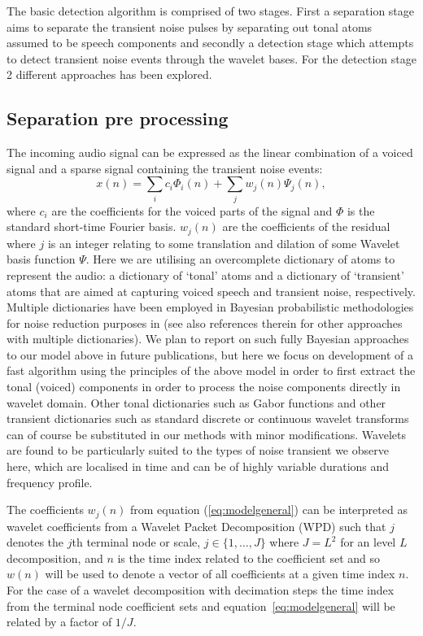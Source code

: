 The basic detection algorithm is comprised of two stages. First a separation stage aims to separate the transient noise pulses by separating out tonal atoms assumed to be speech components and secondly a detection stage which attempts to detect transient noise events through the wavelet bases. For the detection stage 2 different approaches has been explored.

\subsection{Separation pre processing}
The incoming audio signal can be expressed as the linear combination of a voiced signal and a sparse signal containing the transient noise events:
\begin{equation}\label{eq:modelgeneral}
    x(n) = \sum_i c_i \Phi_i(n) + \sum_{j} w_{j}(n) \Psi_{j}(n),
\end{equation}
where $c_i$ are the coefficients for the voiced parts of the signal and $\Phi$ is the standard short-time Fourier basis. $w_{j}(n)$ are the coefficients of the residual where $j$ is an integer relating to some translation and dilation of some Wavelet basis function $\Psi$. Here we are utilising an overcomplete dictionary of atoms to represent the audio: a dictionary of `tonal' atoms and a dictionary of `transient' atoms that are aimed at capturing voiced speech and transient noise, respectively. Multiple dictionaries have been employed in Bayesian probabilistic methodologies for noise reduction purposes in \cite{Fevotte2006}\cite{Fevotte2008} (see also references therein for other approaches with multiple dictionaries). We plan to report on such fully Bayesian approaches to our model above in future publications, but here we focus on development of a fast algorithm using the principles of the above model in order to first extract the tonal (voiced) components in order to process the noise components directly in wavelet domain. Other tonal dictionaries such as Gabor functions and other transient dictionaries such as standard discrete or continuous wavelet transforms can of course be substituted in our methods with minor modifications. Wavelets are found to be particularly suited to the types of noise transient we observe here, which are localised in time and can be of highly variable durations and frequency profile.

The coefficients $w_{j}(n)$ from equation (\ref{eq:modelgeneral}) can be interpreted as wavelet coefficients from a Wavelet Packet Decomposition (WPD) such that $j$ denotes the $j$th terminal node or scale, $j \in \{1, \ldots, J\}$ where $J = L^2$ for an level $L$ decomposition, and $n$ is the time index related to the coefficient set and so $w(n)$ will be used to denote a vector of all coefficients at a given time index $n$. For the case of a wavelet decomposition with decimation steps the time index from the terminal node coefficient sets and equation~\ref{eq:modelgeneral} will be related by a factor of $1/J$.

